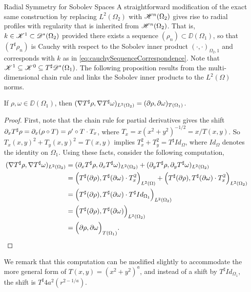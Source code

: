 \begin{chapter}{Radial Symmetry for Sobolev Spaces}
A straightforward modification of the exact same construction by replacing $L^2(\Omega_2)$ with $\mathscr H^n(\Omega_2)$ gives rise to radial profiles with regularity that is inherited from $\mathscr H^n(\Omega_2)$.
That is, $k \in\mathscr K^1 \subset \mathscr D^*(\Omega_2)$ provided there exists a sequence $(\rho_n) \subset \DD(\Omega_1)$, so that $(T^\sharp \rho_n)$ is Cauchy with respect to the Sobolev inner product $( \cdot, \cdot )_{\Omega_2,1}$ and corresponds with $k$ as in \eqref{eq:cauchySequenceCorrespondence}.
Note that $\mathscr K^1 \subseteq \mathscr K^0 \subseteq T^\sharp\mathscr D^*(\Omega_1)$.
The following proposition results from the multi-dimensional chain rule and links the Sobolev inner products to the $L^2(\Omega)$ norms.
\begin{prop} \label{prop:gradChainRule}
  If $\rho,\omega \in \DD(\Omega_1)$, then $(\nabla T^\sharp \rho, \nabla T^\sharp \omega)_{L^2(\Omega_2)} = (\partial \rho,\partial \omega)_{T(\Omega_1)}$.
\end{prop}
\begin{proof}
First, note that the chain rule for partial derivatives gives the shift $\partial_x T^\sharp \rho = \partial_x (\rho\circ T) = \rho'\circ T \cdot T_x$, where $T_x = x(x^2 + y^2)^{-1/2} = x/T(x,y)$.
So $T_x(x,y)^2 + T_y(x,y)^2 = T(x,y)$ implies $T_x^2 + T_y^2 = T^\sharp Id_{\Omega}$, where $Id_{\Omega}$ denotes the identity on $\Omega_1$.
Using these facts, consider the following computation,
\begin{align}
  (\nabla T^\sharp \rho, \nabla T^\sharp \omega)_{L^2(\Omega_2)} 
  &= (\partial_x T^\sharp \rho, \partial_x T^\sharp \omega)_{L^2(\Omega_2)} + (\partial_y T^\sharp \rho, \partial_y T^\sharp \omega)_{L^2(\Omega_2)} \nonumber\\
  &= \Big(T^\sharp(\partial\rho), T^\sharp( \partial\omega)  \cdot T_x^2\Big)_{L^2(\Omega)} + \Big(T^\sharp(\partial\rho), T^\sharp( \partial\omega)  \cdot T_x^2\Big)_{L^2(\Omega_2)} \nonumber\\
  &= \Big(T^\sharp(\partial\rho), T^\sharp( \partial\omega)  \cdot T^\sharp Id_{\Omega_1}\Big)_{L^2(\Omega_2)} \nonumber\\
  &= \Big(T^\sharp(\partial\rho), T^\sharp( \partial\omega) \Big)_{L^2(\Omega_2)} \nonumber\\
  &= \Big(\partial\rho, \partial\omega \Big)_{T(\Omega_1)}.
\end{align}
\end{proof}
We remark that this computation can be modified slightly to accommodate the more general form of $T(x,y) = (x^2+y^2)^a$, and instead of a shift by $T^\sharp Id_{\Omega_1}$, the shift is $T^\sharp 4a^2(r^{2-1/a})$. 


\end{chapter}
